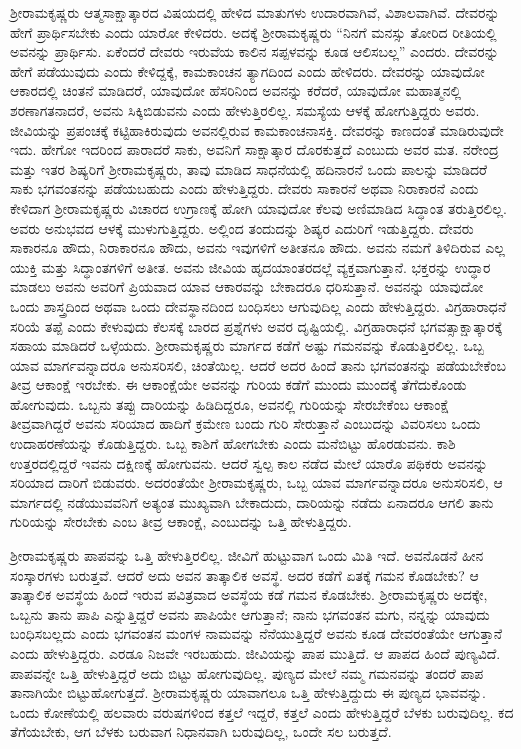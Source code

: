 ಶ‍್ರೀರಾಮಕೃಷ್ಣರು ಆತ್ಮಸಾಕ್ಷಾತ್ಕಾರದ ವಿಷಯದಲ್ಲಿ ಹೇಳಿದ ಮಾತುಗಳು ಉದಾರವಾಗಿವೆ, ವಿಶಾಲವಾಗಿವೆ. ದೇವರನ್ನು ಹೇಗೆ ಪ್ರಾರ್ಥಿಸಬೇಕು ಎಂದು ಯಾರೋ ಕೇಳಿದರು. ಅದಕ್ಕೆ ಶ‍್ರೀರಾಮಕೃಷ್ಣರು “ನಿನಗೆ ಮನಸ್ಸು ತೋರಿದ ರೀತಿಯಲ್ಲಿ ಅವನನ್ನು ಪ್ರಾರ್ಥಿಸು. ಏಕೆಂದರೆ ದೇವರು ಇರುವೆಯ ಕಾಲಿನ ಸಪ್ಪಳವನ್ನು ಕೂಡ ಆಲಿಸಬಲ್ಲ” ಎಂದರು. ದೇವರನ್ನು ಹೇಗೆ ಪಡೆಯುವುದು ಎಂದು ಕೇಳಿದ್ದಕ್ಕೆ, ಕಾಮಕಾಂಚನ ತ್ಯಾಗದಿಂದ ಎಂದು ಹೇಳಿದರು. ದೇವರನ್ನು ಯಾವುದೋ ಆಕಾರದಲ್ಲಿ ಚಿಂತನೆ ಮಾಡಿದರೆ, ಯಾವುದೋ ಹೆಸರಿನಿಂದ ಅವನನ್ನು ಕರೆದರೆ, ಯಾವುದೋ ಮಹಾತ್ಮನಲ್ಲಿ ಶರಣಾಗತನಾದರೆ, ಅವನು ಸಿಕ್ಕಿಬಿಡುವನು ಎಂದು ಹೇಳುತ್ತಿರಲಿಲ್ಲ. ಸಮಸ್ಯೆಯ ಆಳಕ್ಕೆ ಹೋಗುತ್ತಿದ್ದರು ಅವರು. ಜೀವಿಯನ್ನು ಪ್ರಪಂಚಕ್ಕೆ ಕಟ್ಟಿಹಾಕಿರುವುದು ಅವನಲ್ಲಿರುವ ಕಾಮಕಾಂಚನಾಸಕ್ತಿ. ದೇವರನ್ನು ಕಾಣದಂತೆ ಮಾಡಿರುವುದೇ ಇದು. ಹೇಗೋ ಇದರಿಂದ ಪಾರಾದರೆ ಸಾಕು, ಅವನಿಗೆ ಸಾಕ್ಷಾತ್ಕಾರ ದೊರಕುತ್ತದೆ ಎಂಬುದು ಅವರ ಮತ. ನರೇಂದ್ರ ಮತ್ತು ಇತರ ಶಿಷ್ಯರಿಗೆ ಶ‍್ರೀರಾಮಕೃಷ್ಣರು, ತಾವು ಮಾಡಿದ ಸಾಧನೆಯಲ್ಲಿ ಹದಿನಾರನೆ ಒಂದು ಪಾಲನ್ನು ಮಾಡಿದರೆ ಸಾಕು ಭಗವಂತನನ್ನು ಪಡೆಯಬಹುದು ಎಂದು ಹೇಳುತ್ತಿದ್ದರು. ದೇವರು ಸಾಕಾರನೆ ಅಥವಾ ನಿರಾಕಾರನೆ ಎಂದು ಕೇಳಿದಾಗ ಶ‍್ರೀರಾಮಕೃಷ್ಣರು ವಿಚಾರದ ಉಗ್ರಾಣಕ್ಕೆ ಹೋಗಿ ಯಾವುದೋ ಕೆಲವು ಅಣಿಮಾಡಿದ ಸಿದ್ಧಾಂತ ತರುತ್ತಿರಲಿಲ್ಲ. ಅವರು ಅನುಭವದ ಆಳಕ್ಕೆ ಮುಳುಗುತ್ತಿದ್ದರು. ಅಲ್ಲಿಂದ ತಂದುದನ್ನು ಶಿಷ್ಯರ ಎದುರಿಗೆ ಇಡುತ್ತಿದ್ದರು. ದೇವರು ಸಾಕಾರನೂ ಹೌದು, ನಿರಾಕಾರನೂ ಹೌದು, ಅವನು ಇವುಗಳಿಗೆ ಅತೀತನೂ ಹೌದು. ಅವನು ನಮಗೆ ತಿಳಿದಿರುವ ಎಲ್ಲ ಯುಕ್ತಿ ಮತ್ತು ಸಿದ್ಧಾಂತಗಳಿಗೆ ಅತೀತ. ಅವನು ಜೀವಿಯ ಹೃದಯಾಂತರದಲ್ಲೆ ವ್ಯಕ್ತವಾಗುತ್ತಾನೆ. ಭಕ್ತರನ್ನು ಉದ್ಧಾರ ಮಾಡಲು ಅವನು ಅವರಿಗೆ ಪ್ರಿಯವಾದ ಯಾವ ಆಕಾರವನ್ನು ಬೇಕಾದರೂ ಧರಿಸುತ್ತಾನೆ. ಅವನನ್ನು ಯಾವುದೋ ಒಂದು ಶಾಸ್ತ್ರದಿಂದ ಅಥವಾ ಒಂದು ದೇವಸ್ಥಾನದಿಂದ ಬಂಧಿಸಲು ಆಗುವುದಿಲ್ಲ ಎಂದು ಹೇಳುತ್ತಿದ್ದರು. ವಿಗ್ರಹಾರಾಧನೆ ಸರಿಯೆ ತಪ್ಪೆ ಎಂದು ಕೇಳುವುದು ಕೆಲಸಕ್ಕೆ ಬಾರದ ಪ್ರಶ್ನೆಗಳು ಅವರ ದೃಷ್ಟಿಯಲ್ಲಿ. ವಿಗ್ರಹಾರಾಧನೆ ಭಗವತ್ಸಾಕ್ಷಾತ್ಕಾರಕ್ಕೆ ಸಹಾಯ ಮಾಡಿದರೆ ಒಳ್ಳೆಯದು. ಶ‍್ರೀರಾಮಕೃಷ್ಣರು ಮಾರ್ಗದ ಕಡೆಗೆ ಅಷ್ಟು ಗಮನವನ್ನು ಕೊಡುತ್ತಿರಲಿಲ್ಲ. ಒಬ್ಬ ಯಾವ ಮಾರ್ಗವನ್ನಾದರೂ ಅನುಸರಿಸಲಿ, ಚಿಂತೆಯಿಲ್ಲ. ಆದರೆ ಅದರ ಹಿಂದೆ ತಾನು ಭಗವಂತನನ್ನು ಪಡೆಯಬೇಕೆಂಬ ತೀವ್ರ ಆಕಾಂಕ್ಷೆ ಇರಬೇಕು. ಈ ಆಕಾಂಕ್ಷೆಯೇ ಅವನನ್ನು ಗುರಿಯ ಕಡೆಗೆ ಮುಂದು ಮುಂದಕ್ಕೆ ತೆಗೆದುಕೊಂಡು ಹೋಗುವುದು. ಒಬ್ಬನು ತಪ್ಪು ದಾರಿಯನ್ನು ಹಿಡಿದಿದ್ದರೂ, ಅವನಲ್ಲಿ ಗುರಿಯನ್ನು ಸೇರಬೇಕೆಂಬ ಆಕಾಂಕ್ಷೆ ತೀವ್ರವಾಗಿದ್ದರೆ ಅವನು ಸರಿಯಾದ ಹಾದಿಗೆ ಕ್ರಮೇಣ ಬಂದು ಗುರಿ ಸೇರುತ್ತಾನೆ ಎಂಬುದನ್ನು ವಿವರಿಸಲು ಒಂದು ಉದಾಹರಣೆಯನ್ನು ಕೊಡುತ್ತಿದ್ದರು. ಒಬ್ಬ ಕಾಶಿಗೆ ಹೋಗಬೇಕು ಎಂದು ಮನೆಬಿಟ್ಟು ಹೊರಡುವನು. ಕಾಶಿ ಉತ್ತರದಲ್ಲಿದ್ದರೆ ಇವನು ದಕ್ಷಿಣಕ್ಕೆ ಹೋಗುವನು. ಆದರೆ ಸ್ವಲ್ಪ ಕಾಲ ನಡೆದ ಮೇಲೆ ಯಾರೊ ಪಥಿಕರು ಅವನನ್ನು ಸರಿಯಾದ ದಾರಿಗೆ ಬಿಡುವರು. ಅದರಂತೆಯೇ ಶ‍್ರೀರಾಮಕೃಷ್ಣರು, ಒಬ್ಬ ಯಾವ ಮಾರ್ಗವನ್ನಾದರೂ ಅನುಸರಿಸಲಿ, ಆ ಮಾರ್ಗದಲ್ಲಿ ನಡೆಯುವವನಿಗೆ ಅತ್ಯಂತ ಮುಖ್ಯವಾಗಿ ಬೇಕಾದುದು, ದಾರಿಯನ್ನು ನಡೆದು ಏನಾದರೂ ಆಗಲಿ ತಾನು ಗುರಿಯನ್ನು ಸೇರಬೇಕು ಎಂಬ ತೀವ್ರ ಆಕಾಂಕ್ಷೆ, ಎಂಬುದನ್ನು ಒತ್ತಿ ಹೇಳುತ್ತಿದ್ದರು.

ಶ‍್ರೀರಾಮಕೃಷ್ಣರು ಪಾಪವನ್ನು ಒತ್ತಿ ಹೇಳುತ್ತಿರಲಿಲ್ಲ. ಜೀವಿಗೆ ಹುಟ್ಟುವಾಗ ಒಂದು ಮಿತಿ ಇದೆ. ಅವನೊಡನೆ ಹೀನ ಸಂಸ್ಕಾರಗಳು ಬರುತ್ತವೆ. ಆದರೆ ಅದು ಅವನ ತಾತ್ಕಾಲಿಕ ಅವಸ್ಥೆ. ಅದರ ಕಡೆಗೆ ಏತಕ್ಕೆ ಗಮನ ಕೊಡಬೇಕು? ಆ ತಾತ್ಕಾಲಿಕ ಅವಸ್ಥೆಯ ಹಿಂದೆ ಇರುವ ಪವಿತ್ರವಾದ ಅವಸ್ಥೆಯ ಕಡೆ ಗಮನ ಕೊಡಬೇಕು. ಶ‍್ರೀರಾಮಕೃಷ್ಣರು ಅದಕ್ಕೇ, ಒಬ್ಬನು ತಾನು ಪಾಪಿ ಎನ್ನುತ್ತಿದ್ದರೆ ಅವನು ಪಾಪಿಯೇ ಆಗುತ್ತಾನೆ; ನಾನು ಭಗವಂತನ ಮಗು, ನನ್ನನ್ನು ಯಾವುದು ಬಂಧಿಸಬಲ್ಲದು ಎಂದು ಭಗವಂತನ ಮಂಗಳ ನಾಮವನ್ನು ನೆನೆಯುತ್ತಿದ್ದರೆ ಅವನು ಕೂಡ ದೇವರಂತೆಯೇ ಆಗುತ್ತಾನೆ ಎಂದು ಹೇಳುತ್ತಿದ್ದರು. ಎರಡೂ ನಿಜವೇ ಇರಬಹುದು. ಜೀವಿಯನ್ನು ಪಾಪ ಮುತ್ತಿದೆ. ಆ ಪಾಪದ ಹಿಂದೆ ಪುಣ್ಯವಿದೆ. ಪಾಪವನ್ನೇ ಒತ್ತಿ ಹೇಳುತ್ತಿದ್ದರೆ ಅದು ಬಿಟ್ಟು ಹೋಗುವುದಿಲ್ಲ. ಪುಣ್ಯದ ಮೇಲೆ ನಮ್ಮ ಗಮನವನ್ನು ತಂದರೆ ಪಾಪ ತಾನಾಗಿಯೇ ಬಿಟ್ಟುಹೋಗುತ್ತದೆ. ಶ‍್ರೀರಾಮಕೃಷ್ಣರು ಯಾವಾಗಲೂ ಒತ್ತಿ ಹೇಳುತ್ತಿದ್ದುದು ಈ ಪುಣ್ಯದ ಭಾವವನ್ನು. ಒಂದು ಕೋಣೆಯಲ್ಲಿ ಹಲವಾರು ವರುಷಗಳಿಂದ ಕತ್ತಲೆ ಇದ್ದರೆ, ಕತ್ತಲೆ ಎಂದು ಹೇಳುತ್ತಿದ್ದರೆ ಬೆಳಕು ಬರುವುದಿಲ್ಲ. ಕದ ತೆಗೆಯಬೇಕು, ಆಗ ಬೆಳಕು ಬರುವಾಗ ನಿಧಾನವಾಗಿ ಬರುವುದಿಲ್ಲ, ಒಂದೇ ಸಲ ಬರುತ್ತದೆ.


